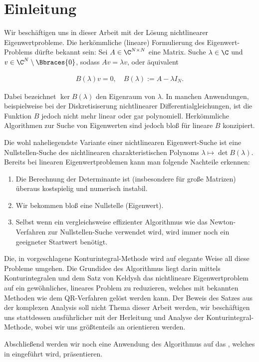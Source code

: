 \chapter{Einleitung}
Wir beschäftigen uns in dieser Arbeit mit der Lösung nichtlinearer Eigenwertprobleme.
Die herkömmliche (lineare) Formulierung des Eigenwert-Problems dürfte bekannt sein:
Sei $A \in \C^{N \times N}$ eine Matrix.
Suche $\lambda \in \C$ und $v \in \C^N \setminus \Bbraces{0}$, sodass $A v = \lambda v$, oder
äquivalent

\begin{align} \label{eq:lineares_ewp}
    B(\lambda) v = 0,
    \quad
    B(\lambda) := A - \lambda I_N.
\end{align}

Dabei bezeichnet $\ker B(\lambda)$ den Eigenraum von $\lambda$.
In manchen Anwendungen, beispielweise bei der Diskretisiserung nichtlinearer Differentialgleichungen, ist die Funktion $B$ jedoch nicht mehr linear oder gar polynomiell.
Herkömmliche Algorithmen zur Suche von Eigenwerten sind jedoch bloß für lineare $B$ konzipiert.

Die wohl naheliegendste Variante einer nichtlinearen Eigenwert-Suche ist eine Nullstellen-Suche
des nichtlinearen charakteristischen Polynoms $\lambda \mapsto \det B(\lambda)$.
Bereits bei linearen Eigenwertproblemen kann man folgende Nachteile erkennen:

\begin{enumerate}[label = \arabic*.]
    \item Die Berechnung der Determinante ist (insbesondere für große Matrizen) überaus kostspielig
    und numerisch instabil.
    \item Wir bekommen bloß eine Nullstelle (Eigenwert).
    \item Selbst wenn ein vergleichsweise effizienter Algorithmus wie das Newton-Verfahren zur Nullstellen-Suche verwendet wird, wird immer noch ein geeigneter Startwert benötigt.
\end{enumerate}

Die, in \cite{BEYN20123839} vorgeschlagene Konturintegral-Methode wird auf elegante Weise all diese Probleme umgehen.
Die Grundidee des Algorithmus liegt darin mittels Konturintegralen und dem
Satz von Keldysh das nichtlineare Eigenwertproblem auf ein gewöhnliches,
lineares Problem zu reduzieren, welches mit bekannten Methoden wie dem QR-Verfahren
gelöst werden kann.
Der Beweis des Satzes aus der komplexen Analysis soll nicht Thema dieser Arbeit werden, wir beschäftigen uns
stattdessen ausführlicher mit der Herleitung und Analyse der Konturintegral-Methode, wobei wir uns größtenteils an \cite{EWPs} orientieren werden.

Abschließend werden wir noch eine Anwendung des Algorithmus
auf das , welches in \cite{saad2020rational} eingeführt wird, präsentieren.
